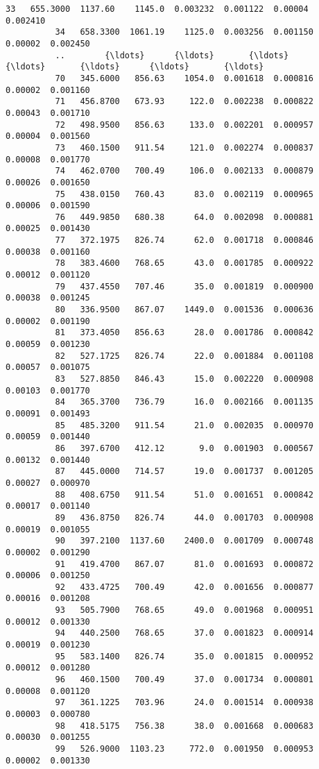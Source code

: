\documentclass[11pt]{article}
\begin{document}
\begin{Verbatim}[commandchars=\\\{\}]
          33   655.3000  1137.60    1145.0  0.003232  0.001122  0.00004  0.002410   
          34   658.3300  1061.19    1125.0  0.003256  0.001150  0.00002  0.002450   
          ..        {\ldots}      {\ldots}       {\ldots}       {\ldots}       {\ldots}      {\ldots}       {\ldots}   
          70   345.6000   856.63    1054.0  0.001618  0.000816  0.00002  0.001160   
          71   456.8700   673.93     122.0  0.002238  0.000822  0.00043  0.001710   
          72   498.9500   856.63     133.0  0.002201  0.000957  0.00004  0.001560   
          73   460.1500   911.54     121.0  0.002274  0.000837  0.00008  0.001770   
          74   462.0700   700.49     106.0  0.002133  0.000879  0.00026  0.001650   
          75   438.0150   760.43      83.0  0.002119  0.000965  0.00006  0.001590   
          76   449.9850   680.38      64.0  0.002098  0.000881  0.00025  0.001430   
          77   372.1975   826.74      62.0  0.001718  0.000846  0.00038  0.001160   
          78   383.4600   768.65      43.0  0.001785  0.000922  0.00012  0.001120   
          79   437.4550   707.46      35.0  0.001819  0.000900  0.00038  0.001245   
          80   336.9500   867.07    1449.0  0.001536  0.000636  0.00002  0.001190   
          81   373.4050   856.63      28.0  0.001786  0.000842  0.00059  0.001230   
          82   527.1725   826.74      22.0  0.001884  0.001108  0.00057  0.001075   
          83   527.8850   846.43      15.0  0.002220  0.000908  0.00103  0.001770   
          84   365.3700   736.79      16.0  0.002166  0.001135  0.00091  0.001493   
          85   485.3200   911.54      21.0  0.002035  0.000970  0.00059  0.001440   
          86   397.6700   412.12       9.0  0.001903  0.000567  0.00132  0.001440   
          87   445.0000   714.57      19.0  0.001737  0.001205  0.00027  0.000970   
          88   408.6750   911.54      51.0  0.001651  0.000842  0.00017  0.001140   
          89   436.8750   826.74      44.0  0.001703  0.000908  0.00019  0.001055   
          90   397.2100  1137.60    2400.0  0.001709  0.000748  0.00002  0.001290   
          91   419.4700   867.07      81.0  0.001693  0.000872  0.00006  0.001250   
          92   433.4725   700.49      42.0  0.001656  0.000877  0.00016  0.001208   
          93   505.7900   768.65      49.0  0.001968  0.000951  0.00012  0.001330   
          94   440.2500   768.65      37.0  0.001823  0.000914  0.00019  0.001230   
          95   583.1400   826.74      35.0  0.001815  0.000952  0.00012  0.001280   
          96   460.1500   700.49      37.0  0.001734  0.000801  0.00008  0.001120   
          97   361.1225   703.96      24.0  0.001514  0.000938  0.00003  0.000780   
          98   418.5175   756.38      38.0  0.001668  0.000683  0.00030  0.001255   
          99   526.9000  1103.23     772.0  0.001950  0.000953  0.00002  0.001330   
          

\end{Verbatim}
\end{document}
